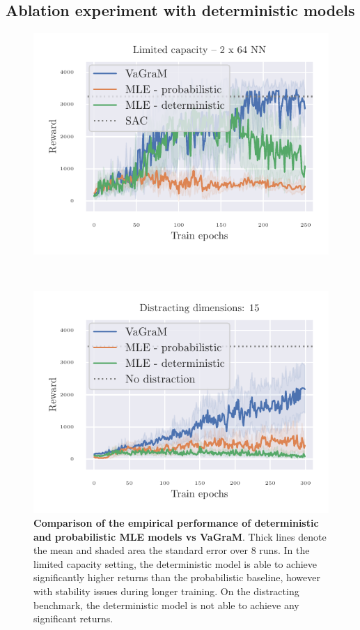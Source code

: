 \subsection{Ablation experiment with deterministic models}
\begin{figure}[t]
    \centering
\begin{minipage}{.48\textwidth}    
    \centering
        \includegraphics[width=1\linewidth]{figures/vagram/fig_3.pdf}
\end{minipage}
~
\begin{minipage}{.48\textwidth}
    \centering
        \includegraphics[width=1\linewidth]{figures/vagram/hopper_distraction_ablation.pdf}
\end{minipage}
    \caption{\textbf{Comparison of the empirical performance of deterministic and probabilistic MLE models vs VaGraM}. Thick lines denote the mean and shaded area the standard error over 8 runs. In the limited capacity setting, the deterministic model is able to achieve significantly higher returns than the probabilistic baseline, however with stability issues during longer training. On the distracting benchmark, the deterministic model is not able to achieve any significant returns.}
    \label{fig:deterministic_experiment}
\end{figure}

